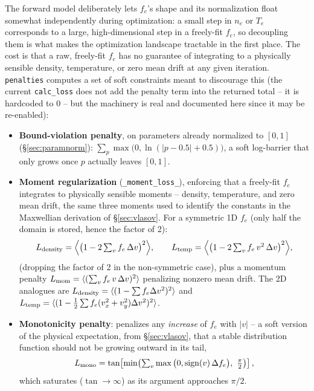 \documentclass[11pt]{article}
\newcommand{\code}[1]{\texttt{#1}}
\begin{document}
The forward model deliberately lets $f_e$'s shape and its normalization float somewhat
independently during optimization: a small step in $n_e$ or $T_e$ corresponds to a large,
high-dimensional step in a freely-fit $f_e$, so decoupling them is what makes the
optimization landscape tractable in the first place. The cost is that a raw, freely-fit
$f_e$ has no guarantee of integrating to a physically sensible density, temperature, or
zero mean drift at any given iteration. \code{penalties} computes a set of soft
constraints meant to discourage this (the current \code{calc\_loss} does not add the
penalty term into the returned total -- it is hardcoded to $0$ -- but the machinery is real
and documented here since it may be re-enabled):
\begin{itemize}
  \item \textbf{Bound-violation penalty}, on parameters already normalized to $[0,1]$
    (\S\ref{sec:paramnorm}): $\sum_p\max\!\big(0,\ln(\vert p-0.5\vert+0.5)\big)$, a soft
    log-barrier that only grows once $p$ actually leaves $[0,1]$.
  \item \textbf{Moment regularization} (\code{\_moment\_loss\_}), enforcing that a freely-fit
    $f_e$ integrates to physically sensible moments -- density, temperature, and zero mean
    drift, the same three moments used to identify the constants in the Maxwellian
    derivation of \S\ref{sec:vlasov}. For a symmetric 1D $f_e$ (only half the domain is
    stored, hence the factor of 2):
    \begin{equation}
      L_{\rm density} = \Big\langle\big(1-2\textstyle\sum_vf_e\,\Delta v\big)^2\Big\rangle,
      \qquad
      L_{\rm temp} = \Big\langle\big(1-2\textstyle\sum_vf_e\,v^2\,\Delta v\big)^2\Big\rangle,
    \end{equation}
    (dropping the factor of 2 in the non-symmetric case), plus a momentum penalty
    $L_{\rm mom}=\langle(\sum_vf_e\,v\,\Delta v)^2\rangle$ penalizing nonzero mean drift.
    The 2D analogues are $L_{\rm density}=\langle(1-\sum f_e\Delta v^2)^2\rangle$ and
    $L_{\rm temp}=\langle(1-\tfrac12\sum f_e(v_x^2+v_y^2)\Delta v^2)^2\rangle$.
  \item \textbf{Monotonicity penalty}: penalizes any \emph{increase} of $f_e$ with
    $\vert v\vert$ -- a soft version of the physical expectation, from \S\ref{sec:vlasov},
    that a stable distribution function should not be growing outward in its tail,
    \begin{equation}
      L_{\rm mono} = \tan\!\left[\min\!\left(\textstyle\sum_v\max\big(0,\operatorname{sign}(v)\,
      \Delta f_e\big),\ \tfrac\pi2\right)\right],
    \end{equation}
    which saturates ($\tan\to\infty$) as its argument approaches $\pi/2$.
\end{itemize}
\end{document}

